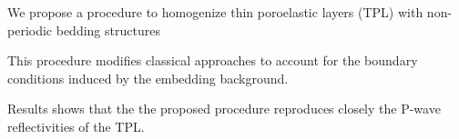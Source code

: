 \documentclass[draft]{agujournal2019}
\begin{document}





\begin{keypoints}
\item We propose a procedure to homogenize thin poroelastic layers (TPL) with non-periodic bedding structures
\item This procedure modifies classical approaches to account for the boundary conditions induced by the embedding background.
\item Results shows that the the proposed procedure reproduces closely the P-wave reflectivities of the TPL.


\end{keypoints}

%
%

%
%
\end{document}
